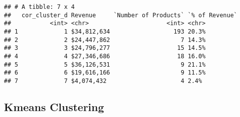 \documentclass[]{article}
\begin{document}
\begin{verbatim}
## # A tibble: 7 x 4
##   cor_cluster_d Revenue     `Number of Products` `% of Revenue`
##           <int> <chr>                      <int> <chr>         
## 1             1 $34,812,634                  193 20.3%         
## 2             2 $24,447,862                    7 14.3%         
## 3             3 $24,796,277                   15 14.5%         
## 4             4 $27,346,686                   18 16.0%         
## 5             5 $36,126,531                    9 21.1%         
## 6             6 $19,616,166                    9 11.5%         
## 7             7 $4,074,432                     4 2.4%
\end{verbatim}

\subsection{Kmeans Clustering}\label{kmeans-clustering}
\end{document}
